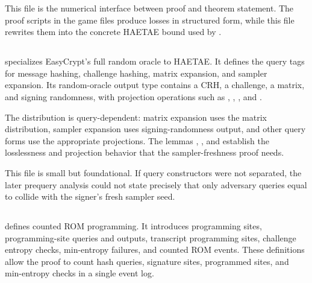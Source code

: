 This file is the numerical interface between proof and theorem statement.  The
proof scripts in the game files produce losses in structured form, while this
file rewrites them into the concrete HAETAE bound used by
.

\subsection[HAETAE\_ROM.ec]{\texorpdfstring{}{HAETAE\_ROM.ec}}

 specializes EasyCrypt's full random oracle to HAETAE.
It defines the query tags for message hashing, challenge hashing, matrix
expansion, and sampler expansion.  Its random-oracle output type contains a CRH,
a challenge, a matrix, and signing randomness, with projection operations such
as ,
, , and
.

The distribution  is query-dependent: matrix expansion uses
the matrix distribution, sampler expansion uses signing-randomness output, and
other query forms use the appropriate projections.  The lemmas
,
, and
 establish the
losslessness and projection behavior that the sampler-freshness proof needs.

This file is small but foundational.  If query constructors were not separated,
the later prequery analysis could not state precisely that only adversary
queries equal to  collide with the signer's fresh
sampler seed.

\subsection[HAETAE\_ROM\_Programming.ec]{\texorpdfstring{}{HAETAE\_ROM\_Programming.ec}}

 defines counted ROM programming.  It
introduces programming sites, programming-site queries and outputs, transcript
programming sites, challenge entropy checks, min-entropy failures, and counted
ROM events.  These definitions allow the proof to count hash queries, signature
sites, programmed sites, and min-entropy checks in a single event log.


